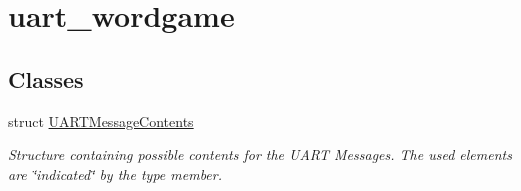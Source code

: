 \hypertarget{group__uart__wordgame}{}\section{uart\+\_\+wordgame}
\label{group__uart__wordgame}
\subsection*{Classes}
\begin{DoxyCompactItemize}
\item 
struct \mbox{\hyperlink{struct_u_a_r_t_message_contents}{U\+A\+R\+T\+Message\+Contents}}
\begin{DoxyCompactList}\small\item\em Structure containing possible contents for the U\+A\+RT Messages. The used elements are \char`\"{}indicated\char`\"{} by the type member. \end{DoxyCompactList}\end{DoxyCompactItemize}
